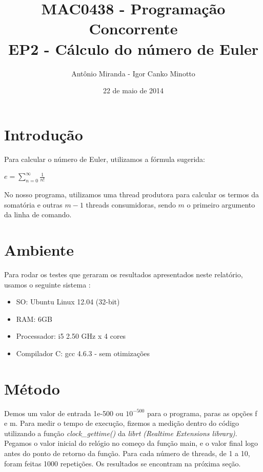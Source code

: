 \documentclass[a4paper,11pt]{article} %
\title{
	\vspace{0 mm}
	\huge{\textbf{MAC0438 - Programação Concorrente}} \\
	\vspace{3 mm}
	\huge{EP2 - Cálculo do número de Euler}
	\vspace{0 mm}
}
\author	{
	\Large{{ Antônio Miranda - Igor Canko Minotto}}	\\
}
\date{\Large{{ 22 de maio de 2014}}}
\begin{document}
\maketitle

\pagebreak 
\tableofcontents

\pagebreak
\setcounter{section}{-1}

\section{Introdução}
  Para calcular o número de Euler, utilizamos a fórmula sugerida: \linebreak 
  \centerline{ $e =\sum\limits_{n=0}^\infty \frac{1}{n!}$ } 
\indent No nosso programa, utilizamos uma thread produtora para calcular os termos da somatória e outras $m-1$ threads consumidoras, sendo $m$ o primeiro argumento da linha de comando. 
  
\section{Ambiente}
  Para rodar os testes que geraram os resultados apresentados neste relatório, usamos o seguinte sistema :
\begin{itemize}
\item SO: Ubuntu Linux 12.04 (32-bit)
\item RAM: 6GB
\item Processador: i5 2.50 GHz x 4 cores
\item Compilador C: gcc 4.6.3 - sem otimizações
\end{itemize}

\section{Método}
  Demos um valor de entrada 1e-500 ou $10^{-500}$ para o programa, paras as opções f e m. Para medir o tempo de execução,
fizemos a medição dentro do código utilizando a função \textit{clock\_gettime()} da \textit{librt (Realtime Extensions library)}.
Pegamos o valor inicial do relógio no começo da função main, e o valor final logo antes do ponto de retorno da função.
Para cada número de threads, de 1 a 10, foram feitas 1000 repetições. Os resultados se encontram na próxima seção.

\pagebreak
\end{document}

